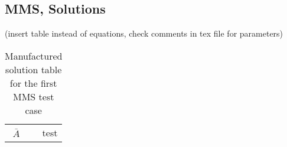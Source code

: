 

\subsection{MMS, Solutions} 

(insert table instead of equations, check comments in tex file for parameters)
\begin{table}[h!]
    \centering
    \begin{tabular}{c|r}
        $\bar{A}$ & test
    \end{tabular}
    \caption{Manufactured solution table for the first MMS test case}
    \label{tab:MMS1_input}
\end{table}






